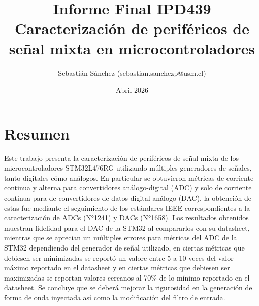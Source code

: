 \documentclass{article}
\title{Informe Final IPD439 \\
Caracterización de periféricos de señal mixta en microcontroladores}
\author{Sebastián Sánchez (sebastian.sanchezp@usm.cl) }
\date{Abril 2026}
\begin{document}
\maketitle

\section{Resumen}
Este trabajo presenta la caracterización de periféricos de señal mixta de los microcontroladores STM32L476RG utilizando múltiples generadores de señales, tanto digitales cómo análogos. En particular se obtuvieron métricas de corriente continua y alterna para convertidores análogo-digital (ADC) y solo de corriente continua para de convertidores de datos digital-análogo (DAC), la obtención de estas fue mediante el seguimiento de los estándares IEEE correspondientes a la caracterización de ADCs (N°1241) y DACs (N°1658). Los resultados obtenidos muestran fidelidad para el DAC de la STM32 al compararlos con su datasheet, mientras que se aprecian un múltiples errores para métricas del ADC de la STM32 dependiendo del generador de señal utilizado, en ciertas métricas que debiesen ser minimizadas se reportó un valore entre 5 a 10 veces del valor máximo reportado en el datasheet y en ciertas métricas que debiesen ser maximizadas se reportan valores cercanos al 70\% de lo mínimo reportado en el datasheet. Se concluye que se deberá mejorar la rigurosidad en la generación de forma de onda inyectada así como la modificación del filtro de entrada.
\end{document}
